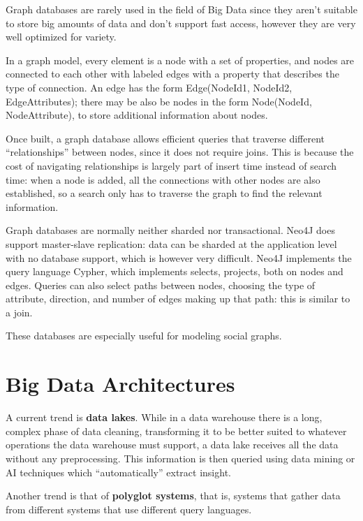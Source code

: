 Graph databases are rarely used in the field of Big Data since they aren't suitable to store big amounts of data and don't support fast access, however they are very well optimized for variety.

In a graph model, every element is a node with a set of properties, and nodes are connected to each other with labeled edges with a property that describes the type of connection. An edge has the form Edge(NodeId1, NodeId2, EdgeAttributes); there may be also be nodes in the form Node(NodeId, NodeAttribute), to store additional information about nodes. 

Once built, a graph database allows efficient queries that traverse different ``relationships'' between nodes, since it does not require joins. This is because the cost of navigating relationships is largely part of insert time instead of search time: when a node is added, all the connections with other nodes are also established, so a search only has to traverse the graph to find the relevant information.

Graph databases are normally neither sharded nor transactional. Neo4J does support master-slave replication: data can be sharded at the application level with no database support, which is however very difficult. Neo4J implements the query language Cypher, which implements selects, projects, both on nodes and edges. Queries can also select paths between nodes, choosing the type of attribute, direction, and number of edges making up that path: this is similar to a join.

These databases are especially useful for modeling social graphs.

\section{Big Data Architectures}

A current trend is \textbf{data lakes}. While in a data warehouse there is a long, complex phase of data cleaning, transforming it to be better suited to whatever operations the data warehouse must support, a data lake receives all the data without any preprocessing. This information is then queried using data mining or AI techniques which ``automatically'' extract insight.

Another trend is that of \textbf{polyglot systems}, that is, systems that gather data from different systems that use different query languages. 